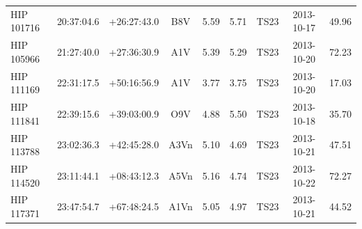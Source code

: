 \begin{scriptsize}
\begin{longtable}{lllcccrcc}
  HIP 101716 &  20:37:04.6 &  +26:27:43.0 &            B8V &     5.59 &     5.71 &       TS23 &  2013-10-17 &           49.96 \\
  HIP 105966 &  21:27:40.0 &  +27:36:30.9 &            A1V &     5.39 &     5.29 &       TS23 &  2013-10-20 &           72.23 \\
  HIP 111169 &  22:31:17.5 &  +50:16:56.9 &            A1V &     3.77 &     3.75 &       TS23 &  2013-10-20 &           17.03 \\
  HIP 111841 &  22:39:15.6 &  +39:03:00.9 &            O9V &     4.88 &     5.50 &       TS23 &  2013-10-18 &           35.70 \\
  HIP 113788 &  23:02:36.3 &  +42:45:28.0 &           A3Vn &     5.10 &     4.69 &       TS23 &  2013-10-21 &           47.51 \\
  HIP 114520 &  23:11:44.1 &  +08:43:12.3 &           A5Vn &     5.16 &     4.74 &       TS23 &  2013-10-22 &           72.27 \\
  HIP 117371 &  23:47:54.7 &  +67:48:24.5 &           A1Vn &     5.05 &     4.97 &       TS23 &  2013-10-21 &           44.52


\end{longtable}
\end{scriptsize}





